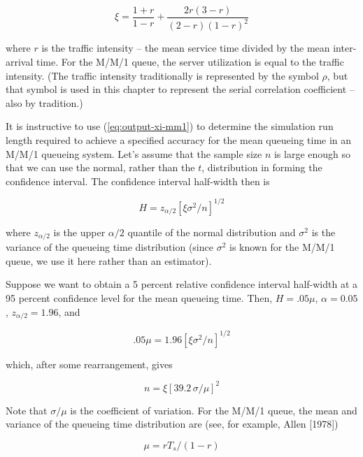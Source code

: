 \begin{equation}
\xi = \frac{1 + r}{1 - r} + \frac{2r(3 - r)}{(2 - r)(1 - r)^2}
\label{eq:output-xi-mm1}
\end{equation}

where $r$ is the traffic intensity -- the mean service time divided by the
mean inter-arrival time. For the M/M/1 queue, the server utilization is equal
to the traffic intensity. (The traffic intensity traditionally is represented
by the symbol $\rho$, but that symbol is used in this chapter to represent the
serial correlation coefficient -- also by tradition.)

It is instructive to use (\ref{eq:output-xi-mm1}) to determine the simulation
run length required to achieve a specified accuracy for the mean queueing time
in an M/M/1 queueing system. Let's assume that the sample size $n$ is large
enough so that we can use the normal, rather than the $t$, distribution in
forming the confidence interval. The confidence interval half-width then is

\begin{equation}
H = z_{\alpha/2} \left[\xi \sigma^2 / n \right]^{1/2}
\label{eq:output-ci-halfwidth-normal}
\end{equation}

where $z_{\alpha/2}$ is the upper $\alpha/2$ quantile of the normal
distribution and $\sigma^2$ is the variance of the queueing time distribution
(since $\sigma^2$ is known for the M/M/1 queue, we use it here rather than an
estimator).

Suppose we want to obtain a 5 percent relative confidence interval half-width
at a 95 percent confidence level for the mean queueing time. Then,
$H = .05\mu$, $\alpha = 0.05$, $z_{\alpha/2} = 1.96$, and

\begin{equation}
.05\mu = 1.96 \left[\xi \sigma^2 / n \right]^{1/2}
\label{eq:output-ci-relative}
\end{equation}

which, after some rearrangement, gives

\begin{equation}
n = \xi \left[39.2 \, \sigma/\mu \right]^2
\label{eq:output-sample-size}
\end{equation}

Note that $\sigma/\mu$ is the coefficient of variation. For the M/M/1 queue,
the mean and variance of the queueing time distribution are (see, for example,
Allen [1978])

\begin{equation}
\mu = r T_s / (1 - r)
\label{eq:output-mm1-mean}
\end{equation}

